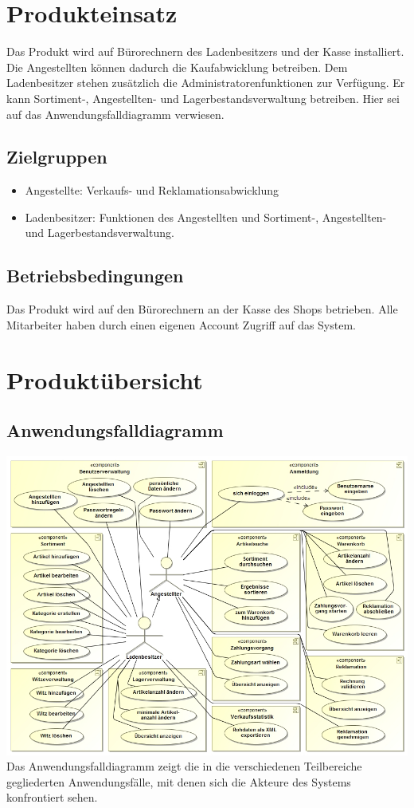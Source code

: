 \documentclass[pdftex,12pt,a4paper]{article}
\begin{document}
\section{Produkteinsatz}
Das Produkt wird auf B\"urorechnern des Ladenbesitzers und der Kasse installiert. Die Angestellten k\"onnen dadurch die Kaufabwicklung betreiben. Dem Ladenbesitzer stehen zus\"atzlich die Administratorenfunktionen zur Verf\"ugung. Er kann Sortiment-, Angestellten- und Lagerbestandsverwaltung betreiben. Hier sei auf das Anwendungsfalldiagramm verwiesen.
\subsection*{Zielgruppen}
\begin{itemize}
\item Angestellte: Verkaufs- und Reklamationsabwicklung
\item Ladenbesitzer: Funktionen des Angestellten und Sortiment-, Angestellten- und Lagerbestandsverwaltung.
\end{itemize}
\subsection*{Betriebsbedingungen}
Das Produkt wird auf den B\"urorechnern an der Kasse des Shops betrieben. Alle Mitarbeiter haben durch einen eigenen Account Zugriff auf das System.

\section{Produkt\"ubersicht}
\subsection*{Anwendungsfalldiagramm}
\includegraphics[width=1\textwidth]{./images/anwendungsfalldiagramm}
Das Anwendungsfalldiagramm zeigt die in die verschiedenen Teilbereiche gegliederten Anwendungsf\"alle, mit denen sich die Akteure des Systems konfrontiert sehen.
\end{document}
